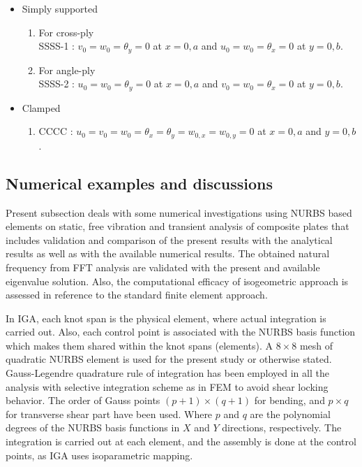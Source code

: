 \documentclass[3p,preprint,12pt]{elsarticle}
\begin{document}
\begin{itemize}
	\item Simply supported
	\begin{enumerate}
		\item For cross-ply\\	
		SSSS-1 : $v_0=w_0=\theta_{y}=0$ at $x=0,a$ and $u_0=w_0=\theta_{x}=0$ at $y=0,b$.
		\item For angle-ply\\	
		SSSS-2 : $u_0=w_0=\theta_{y}=0$ at $x=0,a$ and $v_0=w_0=\theta_{x}=0$ at $y=0,b$.
	\end{enumerate}
	\item Clamped
	\begin{enumerate}
		\item CCCC : $u_0=v_0=w_0=\theta_{x}=\theta_{y}=w_{0,x}=w_{0,y}=0$ at $x=0,a$ and $y=0,b$.
	\end{enumerate}
\end{itemize}

\subsection{Numerical examples and discussions }
Present subsection deals with some numerical investigations using NURBS based elements on static, free vibration and transient analysis of composite plates that includes validation and comparison of the present results with the analytical results as well as with the available numerical results. The obtained natural frequency from FFT analysis are validated with the present and available eigenvalue solution. Also, the computational efficacy of isogeometric approach is assessed in reference to the standard finite element approach.

In IGA, each knot span is the physical element, where actual integration is carried out. Also, each control point is associated with the NURBS basis function which makes them shared within the knot spans (elements). A $8 \times 8$ mesh of quadratic NURBS element is used for the present study or otherwise stated. Gauss-Legendre quadrature rule of integration has been employed in all the analysis with selective integration scheme as in FEM \cite{adam2014improved, adam2015improved, prathap2013finite} to avoid shear locking behavior. The order of Gauss points $(p+1)\times(q+1)$ for bending, and $p\times q$ for transverse shear part have been used. Where $p$ and $q$ are the polynomial degrees of the NURBS basis functions in $X$ and $Y$ directions, respectively. The integration is carried out at each element, and the assembly is done at the control points, as IGA uses isoparametric mapping.
\end{document}
